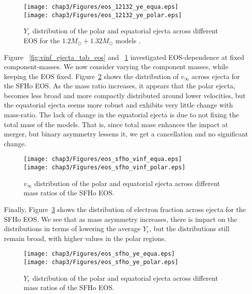   \begin{figure}[!htbp]
    \centering
  \texttt{[image: chap3/Figures/eos\_12132\_ye\_equa.eps]}\\
  \texttt{[image: chap3/Figures/eos\_12132\_ye\_polar.eps]}
\caption{
   $Y_e$ distribution of the polar and equatorial ejecta across different EOS for the $1.2M_\odot + 1.32M_\odot$ models .
}
\label{fig:ye_ejecta_tab_eos}
\end{figure}

Figure ~\ref{fig:vinf_ejecta_tab_eos} and ~\ref{fig:ye_ejecta_tab_eos} investigated EOS-dependence at fixed component-masses. We now consider varying the component masses, while keeping the EOS fixed. Figure~\ref{fig:vinf_ejecta_tab_sfho} shows the distribution of $v_\infty$ across ejecta for the SFHo EOS. As the mass ratio increases, it appears that the polar ejecta, becomes less broad and more compactly distributed around lower velocities, but the equatorial ejecta seems more robust and exhibits very little change with mass-ratio. The lack of change in the equatorial ejecta is due to not fixing the total mass of the models. That is, since total mass enhances the impact at merger, but binary asymmetry lessens it, we get a cancellation and no significant change.

\begin{figure}[!htbp]
  \centering
  \texttt{[image: chap3/Figures/eos\_sfho\_vinf\_equa.eps]}\\
  \texttt{[image: chap3/Figures/eos\_sfho\_vinf\_polar.eps]}
\caption{
   $v_\infty$ distribution of the polar and equatorial ejecta across different mass ratios of the SFHo EOS.
}
\label{fig:vinf_ejecta_tab_sfho}
\end{figure}

Finally, Figure~\ref{fig:ye_ejecta_tab_sfho} shows the distribution of electron fraction across ejecta for the SFHo EOS. We see that as mass asymmetry increases, there is impact on the distributions in terms of lowering the average $Y_e$, but the distributions still remain broad, with higher values in the polar regions.

\begin{figure}[!htbp]
  \centering
     \texttt{[image: chap3/Figures/eos\_sfho\_ye\_equa.eps]}\\
 \texttt{[image: chap3/Figures/eos\_sfho\_ye\_polar.eps]}
\caption{
   $Y_e$ distribution of the polar and equatorial ejecta across different mass ratios of the SFHo EOS.
}
\label{fig:ye_ejecta_tab_sfho}
\end{figure}


